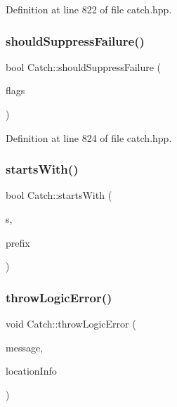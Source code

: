 Definition at line 822 of file catch.\+hpp.

\hypertarget{namespace_catch_ab91eb13081203d634fe48d3d2ab386d7}{}\label{namespace_catch_ab91eb13081203d634fe48d3d2ab386d7} 
\subsubsection{\texorpdfstring{should\+Suppress\+Failure()}{shouldSuppressFailure()}}
{\footnotesize\ttfamily bool Catch\+::should\+Suppress\+Failure (\begin{DoxyParamCaption}\item[{int}]{flags }\end{DoxyParamCaption})\hspace{0.3cm}{\ttfamily [inline]}}



Definition at line 824 of file catch.\+hpp.

\hypertarget{namespace_catch_a695f62327be0676e046291eeaae15110}{}\label{namespace_catch_a695f62327be0676e046291eeaae15110} 
\subsubsection{\texorpdfstring{starts\+With()}{startsWith()}}
{\footnotesize\ttfamily bool Catch\+::starts\+With (\begin{DoxyParamCaption}\item[{std\+::string const \&}]{s,  }\item[{std\+::string const \&}]{prefix }\end{DoxyParamCaption})}

\hypertarget{namespace_catch_a702b612f683d154c466ea8297ed4a20d}{}\label{namespace_catch_a702b612f683d154c466ea8297ed4a20d} 
\subsubsection{\texorpdfstring{throw\+Logic\+Error()}{throwLogicError()}}
{\footnotesize\ttfamily void Catch\+::throw\+Logic\+Error (\begin{DoxyParamCaption}\item[{std\+::string const \&}]{message,  }\item[{\hyperlink{struct_catch_1_1_source_line_info}{Source\+Line\+Info} const \&}]{location\+Info }\end{DoxyParamCaption})}

